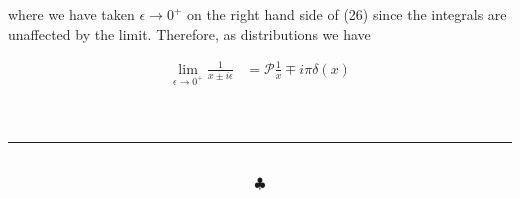 \documentclass[]{article}
\begin{document}
\begin{enumerate}[1)]
where we have taken $\epsilon \to 0^+$ on the right hand side of (26) since the integrals are unaffected by the limit. Therefore, as distributions we have

\begin{equation}
\begin{split}
\lim_{\epsilon \to 0^+ } \frac{1}{ x \pm i\epsilon} & = \mathscr{P} \frac{1}{x} \mp i\pi \delta(x) \\
\end{split}
\end{equation}

\end{enumerate}



\hfill \\
\noindent\rule{15cm}{0.4pt} \\







$$\clubsuit$$
\end{document}
